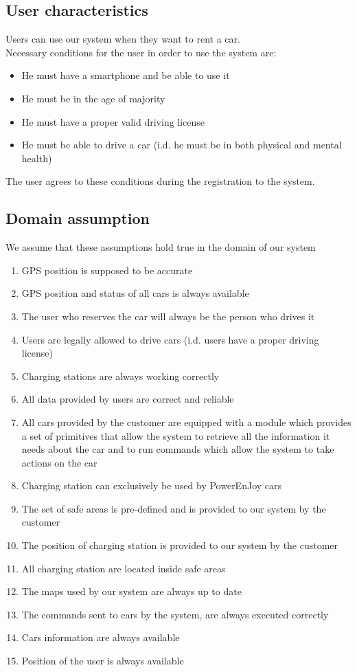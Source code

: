 \subsection{User characteristics}
	Users can use our system when they want to rent a car.\\
	Necessary conditions for the user in order to use the system are:
	\begin{itemize}
		\item He must have a smartphone and be able to use it
		\item He must be in the age of majority
		\item He must have a proper valid driving license
		\item He must be able to drive a car (i.d. he must be in both physical and mental health)
	\end{itemize}
	The user agrees to these conditions during the registration to the system.

\subsection{Domain assumption}
	We assume that these assumptions hold true in the domain of our system 
	\begin{enumerate}[label=\textbf{DA\arabic*}]
		\item GPS position is supposed to be accurate
		\item GPS position and status of all cars is always available
		\item The user who reserves the car will always be the person who drives it
		\item Users are legally allowed to drive cars (i.d. users have a proper driving license)
		\item Charging stations are always working correctly
		\item All data provided by users are correct and reliable
		\item All cars provided by the customer are equipped with a module which provides a set of
		primitives that allow the system to retrieve all the information it needs about
		the car and to run commands which allow the system to take actions on the car
		\item Charging station can exclusively be used by PowerEnJoy cars
		\item The set of safe areas is pre-defined and is provided to our system by the customer
		\item The position of charging station is provided to our system by the customer
		\item All charging station are located inside safe areas
		\item The maps used by our system are always up to date
		\item The commands sent to cars by the system, are always executed
		correctly
		\item Cars information are always available
		\item Position of the user is always available
		
	\end{enumerate}